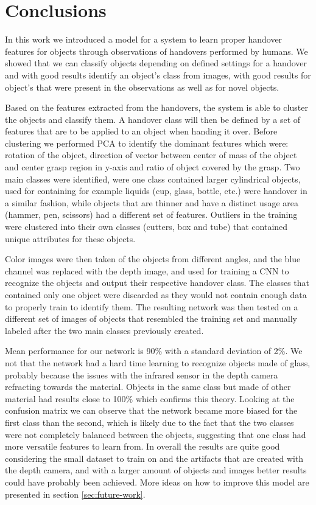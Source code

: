\section{Conclusions}

In this work we introduced a model for a system to learn proper handover features for objects through observations of handovers performed by humans. We showed that we can classify objects depending on defined settings for a handover and with good results identify an object's class from images, with good results for object's that were present in the observations as well as for novel objects.

Based on the features extracted from the handovers, the system is able to cluster the objects and classify them. A handover class will then be defined by a set of features that are to be applied to an object when handing it over. Before clustering we performed PCA to identify the dominant features which were: rotation of the object, direction of vector between center of mass of the object and center grasp region in y-axis and ratio of object covered by the grasp. Two main classes were identified, were one class contained larger cylindrical objects, used for containing for example liquids (cup, glass, bottle, etc.) were handover in a similar fashion, while objects that are thinner and have a distinct usage area (hammer, pen, scissors) had a different set of features. Outliers in the training were clustered into their own classes (cutters, box and tube) that contained unique attributes for these objects.

Color images were then taken of the objects from different angles, and the blue channel was replaced with the depth image, and used for training a CNN to recognize the objects and output their respective handover class. The classes that contained only one object were discarded as they would not contain enough data to properly train to identify them. The resulting network was then tested on a different set of images of objects that resembled the training set and manually labeled after the two main classes previously created.

Mean performance for our network is 90\% with a standard deviation of 2\%. We not that the network had a hard time learning to recognize objects made of glass, probably because the issues with the infrared sensor in the depth camera refracting towards the material. Objects in the same class but made of other material had results close to 100\% which confirms this theory. Looking at the confusion matrix we can observe that the network became more biased for the first class than the second, which is likely due to the fact that the two classes were not completely balanced between the objects, suggesting that one class had more versatile features to learn from. In overall the results are quite good considering the small dataset to train on and the artifacts that are created with the depth camera, and with a larger amount of objects and images better results could have probably been achieved. More ideas on how to improve this model are presented in section \ref{sec:future-work}.


